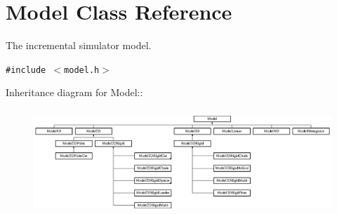 \section{Model  Class Reference}
\label{class_Model}
The incremental simulator model. 


{\tt \#include $<$model.h$>$}

Inheritance diagram for Model::\begin{figure}[H]
\begin{center}
\leavevmode
\includegraphics[height=3.97163cm]{class_Model}
\end{center}
\end{figure}
